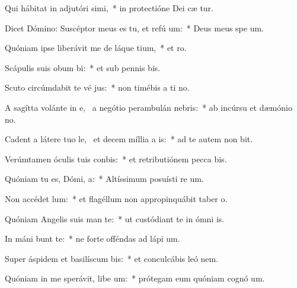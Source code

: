 \item Qui hábitat in adjutóri simi,~* in protectióne Dei cæ tur.
\item Dicet Dómino: Suscéptor meus es tu, et refú um:~* Deus meus spe  um.
\item Quóniam ipse liberávit me de láque tium,~* et   ro.
\item Scápulis suis obum bi:~* et sub pennis  bis.
\item Scuto circúmdabit te vé jus:~* non timébis a ti no.
\item A sagítta volánte in e,~\pscross{} a negótio perambulán  nebris:~* ab incúrsu et dæmónio no.
\item Cadent a látere tuo le,~\pscross{} et decem míllia a  is:~* ad te autem non bit.
\item Verúmtamen óculis tuis conbis:~* et retributiónem pecca bis.
\item Quóniam tu es, Dómi,  a:~* Altíssimum posuísti re um.
\item Non accédet   lum:~* et flagéllum non appropinquábit taber o.
\item Quóniam Angelis suis man  te:~* ut custódiant te in ómni  is.
\item In máni bunt te:~* ne forte offéndas ad lápi  um.
\item Super áspidem et basilíscum bis:~* et conculcábis leó  nem.
\item Quóniam in me sperávit, libe um:~* prótegam eum quóniam cognó  um.
